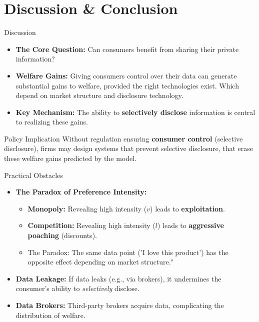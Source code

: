 \documentclass{beamer}
\begin{document}
\section{Discussion \& Conclusion}
\begin{frame}{Discussion}
    \begin{itemize}
        \setlength\itemsep{1em}
        \item \textbf{The Core Question:} Can consumers benefit from sharing their private information?
        \item \textbf{Welfare Gains:} Giving consumers control over their data can generate substantial gains to welfare, provided the right technologies exist. Which depend on market structure and disclosure technology.
        \item \textbf{Key Mechanism:} The ability to \textbf{selectively disclose} information is central to realizing these gains.
    \end{itemize}

    \begin{alertblock}{Policy Implication}
        Without regulation ensuring \textbf{consumer control} (selective disclosure), firms may design systems that prevent selective disclosure, that erase these welfare gains predicted by the model.
    \end{alertblock}
\end{frame}



\begin{frame}{Practical Obstacles}
    \begin{itemize}
         \item \textbf{The Paradox of Preference Intensity:}
        \begin{itemize}
            \item \textbf{Monopoly:} Revealing high intensity ($v$) leads to \textbf{exploitation}.
            \item \textbf{Competition:} Revealing high intensity ($l$) leads to \textbf{aggressive poaching} (discounts).
            \item The Paradox: The same data point ('I love this product') has the opposite effect depending on market structure."
        \end{itemize}
        
        \item \textbf{Data Leakage:} If data leaks (e.g., via brokers), it undermines the consumer's ability to \textit{selectively} disclose.

        \item \textbf{Data Brokers:} Third-party brokers acquire data, complicating the distribution of welfare.
    \end{itemize}
\end{frame}
\end{document}
